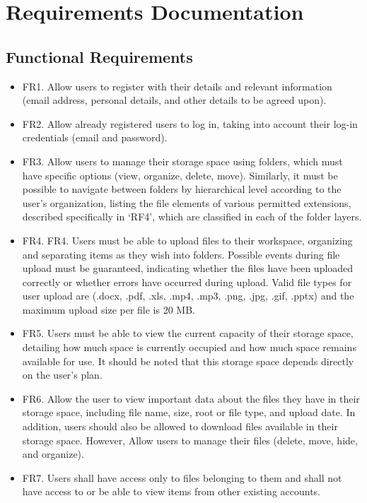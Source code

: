 \section{Requirements Documentation}
\subsection{Functional Requirements}
\begin{itemize}
    \item FR1. Allow users to register with their details and relevant information (email address, personal details, and other details to be agreed upon).
    \item FR2. Allow already registered users to log in, taking into account their log-in credentials (email and password).
    \item FR3. Allow users to manage their storage space using folders, which must have specific options (view, organize, delete, move). Similarly, it must be possible to navigate between folders by hierarchical level according to the user's organization, listing the file elements of various permitted extensions, described specifically in ‘RF4’, which are classified in each of the folder layers.
    \item FR4. FR4. Users must be able to upload files to their workspace, organizing and separating items as they wish into folders. Possible events during file upload must be guaranteed, indicating whether the files have been uploaded correctly or whether errors have occurred during upload. Valid file types for user upload are (.docx, .pdf, .xls, .mp4, .mp3, .png, .jpg, .gif, .pptx) and the maximum upload size per file is 20 MB.
    \item FR5. Users must be able to view the current capacity of their storage space, detailing how much space is currently occupied and how much space remains available for use. It should be noted that this storage space depends directly on the user's plan.
    \item FR6. Allow the user to view important data about the files they have in their storage space, including file name, size, root or file type, and upload date. In addition, users should also be allowed to download files available in their storage space.
    However, Allow users to manage their files (delete, move, hide, and organize).
    \item FR7. Users shall have access only to files belonging to them and shall not have access to or be able to view items from other existing accounts.

\end{itemize}

